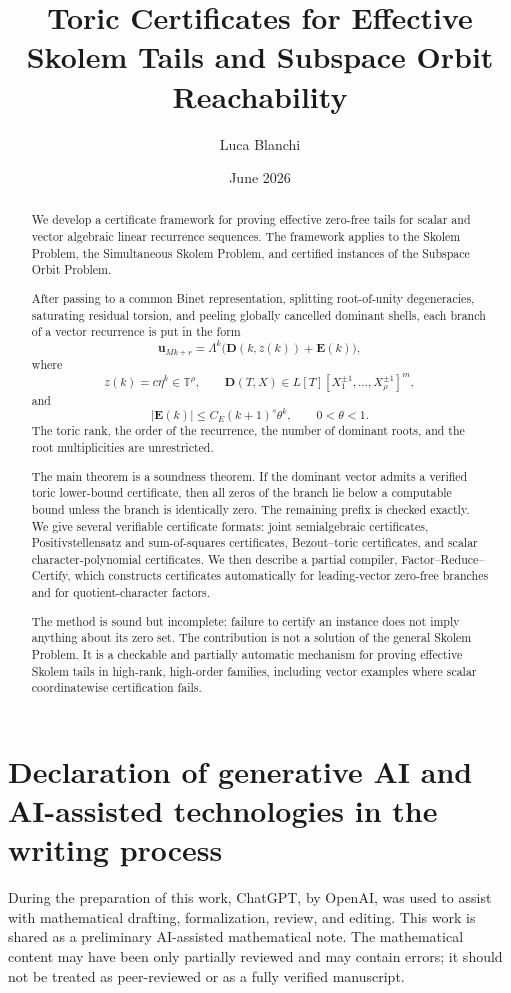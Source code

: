 \documentclass[11pt]{article}
\title{Toric Certificates for Effective Skolem Tails and Subspace Orbit Reachability}
\author{Luca Blanchi}
\date{June 2026}
\newcommand{\T}{\mathbb T}
\begin{document}
\maketitle

\begin{abstract}
We develop a certificate framework for proving effective zero-free tails for scalar and vector algebraic linear recurrence sequences. The framework applies to the Skolem Problem, the Simultaneous Skolem Problem, and certified instances of the Subspace Orbit Problem.

After passing to a common Binet representation, splitting root-of-unity degeneracies, saturating residual torsion, and peeling globally cancelled dominant shells, each branch of a vector recurrence is put in the form
\[
\mathbf u_{Mk+r}
=
\Lambda^k\bigl(\mathbf D(k,z(k))+\mathbf E(k)\bigr),
\]
where
\[
z(k)=c\eta^k\in \T^\rho,
\qquad
\mathbf D(T,X)\in L[T][X_1^{\pm1},\ldots,X_\rho^{\pm1}]^m,
\]
and
\[
|\mathbf E(k)|\le C_E(k+1)^s\theta^k,
\qquad
0<\theta<1.
\]
The toric rank, the order of the recurrence, the number of dominant roots, and the root multiplicities are unrestricted.

The main theorem is a soundness theorem. If the dominant vector admits a verified toric lower-bound certificate, then all zeros of the branch lie below a computable bound unless the branch is identically zero. The remaining prefix is checked exactly. We give several verifiable certificate formats: joint semialgebraic certificates, Positivstellensatz and sum-of-squares certificates, Bezout--toric certificates, and scalar character-polynomial certificates. We then describe a partial compiler, Factor--Reduce--Certify, which constructs certificates automatically for leading-vector zero-free branches and for quotient-character factors.

The method is sound but incomplete: failure to certify an instance does not imply anything about its zero set. The contribution is not a solution of the general Skolem Problem. It is a checkable and partially automatic mechanism for proving effective Skolem tails in high-rank, high-order families, including vector examples where scalar coordinatewise certification fails.
\end{abstract}

\section*{Declaration of generative AI and AI-assisted technologies in the writing process}
During the preparation of this work, ChatGPT, by OpenAI, was used to assist with mathematical drafting, formalization, review, and editing. This work is shared as a preliminary AI-assisted mathematical note. The mathematical content may have been only partially reviewed and may contain errors; it should not be treated as peer-reviewed or as a fully verified manuscript.
\end{document}
